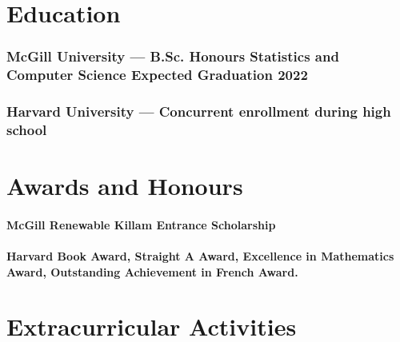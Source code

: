 \documentclass{article}
\begin{document}
\section{Education\hfill\normalsize }

\subsubsection{McGill University --- B.Sc. Honours Statistics and Computer Science \hfill Expected Graduation 2022}


\subsubsection{Harvard University --- Concurrent enrollment during high school}

% 

\section{Awards and Honours}

\paragraph{McGill Renewable Killam Entrance Scholarship}

\paragraph{Harvard Book Award, Straight A Award, Excellence in Mathematics Award, Outstanding Achievement in French Award.}


\section{Extracurricular Activities}
\end{document}
